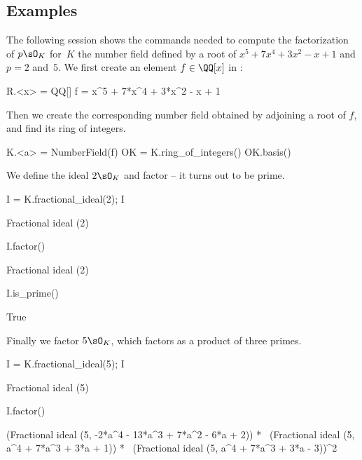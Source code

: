 \subsection{Examples}

The following {\Sage} session shows the commands needed to compute
the factorization of $p\sO_K$ for~$K$ the number field defined by
a root of $x^5 + 7x^4 + 3x^2 - x + 1$ and $p = 2$ and~$5$. We first
create an element $f\in \QQ[x]$ in {\Sage}:
\begin{sagecode}
\begin{sagecell}
R.<x> = QQ[]
f = x^5 + 7*x^4 + 3*x^2 - x + 1
\end{sagecell}
\end{sagecode} %

\noindent
Then we create the corresponding number field obtained
by adjoining a root of $f$, and find its ring of integers.
\begin{sagecode} %
\begin{sagecell}
K.<a> = NumberField(f)
OK = K.ring_of_integers()
OK.basis()
\end{sagecell}
\begin{sageout}
[1, a, a^2, a^3, a^4]
\end{sageout}
\end{sagecode} %

\noindent
We define the ideal $2\sO_K$ and factor -- it turns out to be prime.

\begin{sagecode} %
\begin{sagecell}
I = K.fractional_ideal(2); I
\end{sagecell}
\begin{sageout}
Fractional ideal (2)
\end{sageout}
\begin{sagecell}
I.factor()
\end{sagecell}
\begin{sageout}
Fractional ideal (2)
\end{sageout}
\begin{sagecell}
I.is_prime()
\end{sagecell}
\begin{sageout}
True
\end{sageout}
\end{sagecode} %

\noindent
Finally we factor $5\sO_K$, which factors as a product of three primes.

\begin{sagecode} %
\begin{sagecell}
I = K.fractional_ideal(5); I
\end{sagecell}
\begin{sageout}
Fractional ideal (5)
\end{sageout}
\begin{sagecell}
I.factor()
\end{sagecell}
\begin{sageout}
(Fractional ideal (5, -2*a^4 - 13*a^3 + 7*a^2 - 6*a + 2)) * \
(Fractional ideal (5, a^4 + 7*a^3 + 3*a + 1)) * \
(Fractional ideal (5, a^4 + 7*a^3 + 3*a - 3))^2
\end{sageout}
\end{sagecode} %

